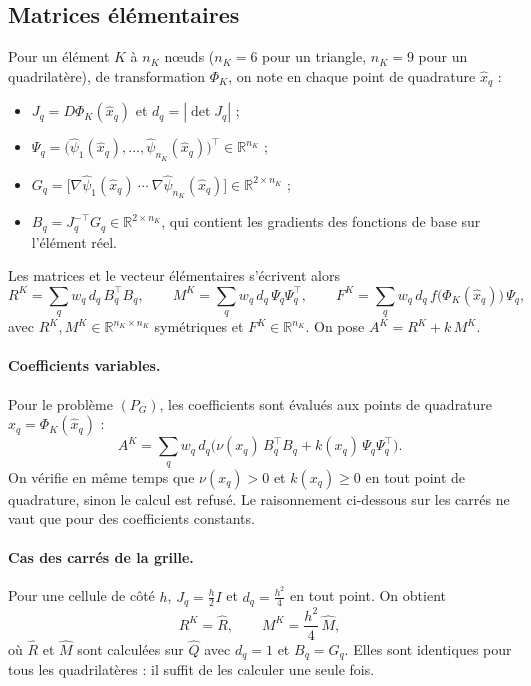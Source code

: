 \documentclass[11pt,a4paper]{article}
\begin{document}
\subsection{Matrices élémentaires}
\label{sec:elementaires}

Pour un élément $K$ à $n_K$ nœuds ($n_K = 6$ pour un triangle,
$n_K = 9$ pour un quadrilatère), de transformation $\Phi_K$, on note en
chaque point de quadrature $\hat{x}_q$ :
\begin{itemize}
  \item $J_q = D\Phi_K(\hat{x}_q)$ et $d_q = |\det J_q|$ ;
  \item $\Psi_q = \big(\widehat{\psi}_1(\hat{x}_q), \dots, \widehat{\psi}_{n_K}(\hat{x}_q)\big)^{\top} \in \mathbb{R}^{n_K}$ ;
  \item $G_q = \big[\nabla\widehat{\psi}_1(\hat{x}_q) \ \cdots\ \nabla\widehat{\psi}_{n_K}(\hat{x}_q)\big] \in \mathbb{R}^{2 \times n_K}$ ;
  \item $B_q = J_q^{-\top} G_q \in \mathbb{R}^{2 \times n_K}$, qui contient
        les gradients des fonctions de base sur l'élément réel.
\end{itemize}
Les matrices et le vecteur élémentaires s'écrivent alors
\[
R^K = \sum_{q} w_q\, d_q\, B_q^{\top} B_q ,
\qquad
M^K = \sum_{q} w_q\, d_q\, \Psi_q \Psi_q^{\top} ,
\qquad
F^K = \sum_{q} w_q\, d_q\, f\big(\Phi_K(\hat{x}_q)\big)\, \Psi_q ,
\]
avec $R^K, M^K \in \mathbb{R}^{n_K \times n_K}$ symétriques et
$F^K \in \mathbb{R}^{n_K}$. On pose $A^K = R^K + k\, M^K$.

\paragraph{Coefficients variables.} Pour le problème $(P_G)$, les coefficients
sont évalués aux points de quadrature $x_q = \Phi_K(\hat{x}_q)$ :
\[
A^K = \sum_{q} w_q\, d_q \Big( \nu(x_q)\, B_q^{\top} B_q
+ k(x_q)\, \Psi_q \Psi_q^{\top} \Big).
\]
On vérifie en même temps que $\nu(x_q) > 0$ et $k(x_q) \ge 0$ en tout point
de quadrature, sinon le calcul est refusé. Le raisonnement ci-dessous sur
les carrés ne vaut que pour des coefficients constants.

\paragraph{Cas des carrés de la grille.} Pour une cellule de côté $h$,
$J_q = \tfrac{h}{2} I$ et $d_q = \tfrac{h^2}{4}$ en tout point. On obtient
\[
R^K = \widehat{R}, \qquad M^K = \frac{h^2}{4}\, \widehat{M},
\]
où $\widehat{R}$ et $\widehat{M}$ sont calculées sur $\widehat{Q}$ avec
$d_q = 1$ et $B_q = G_q$. Elles sont identiques pour tous les
quadrilatères : il suffit de les calculer une seule fois.
\end{document}
